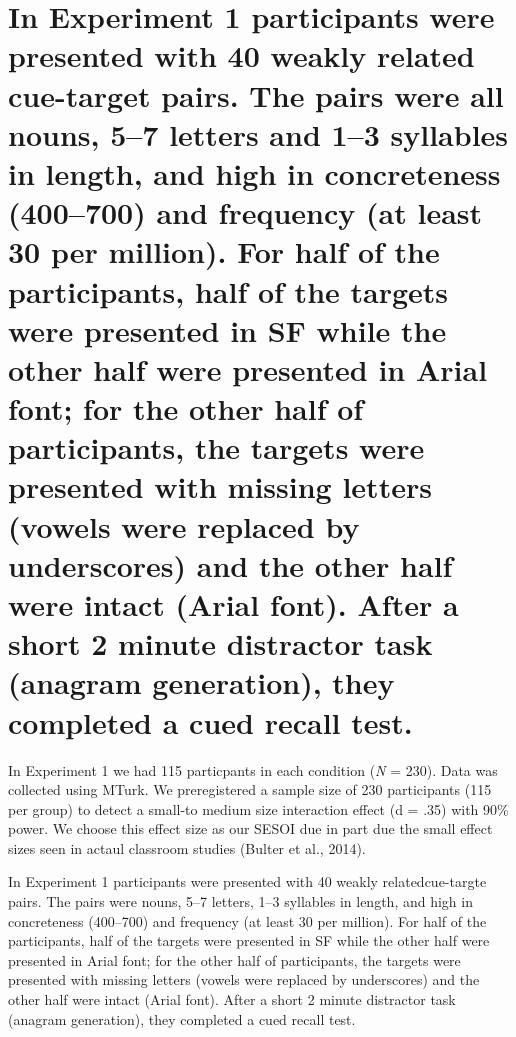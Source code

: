 \documentclass[]{article}
\begin{document}
\hypertarget{in-experiment-1-participants-were-presented-with-40-weakly-related-cue-target-pairs.-the-pairs-were-all-nouns-57-letters-and-13-syllables-in-length-and-high-in-concreteness-400700-and-frequency-at-least-30-per-million.-for-half-of-the-participants-half-of-the-targets-were-presented-in-sf-while-the-other-half-were-presented-in-arial-font-for-the-other-half-of-participants-the-targets-were-presented-with-missing-letters-vowels-were-replaced-by-underscores-and-the-other-half-were-intact-arial-font.-after-a-short-2-minute-distractor-task-anagram-generation-they-completed-a-cued-recall-test.}{%
\section{In Experiment 1 participants were presented with 40 weakly
related cue-target pairs. The pairs were all nouns, 5--7 letters and
1--3 syllables in length, and high in concreteness (400--700) and
frequency (at least 30 per million). For half of the participants, half
of the targets were presented in SF while the other half were presented
in Arial font; for the other half of participants, the targets were
presented with missing letters (vowels were replaced by underscores) and
the other half were intact (Arial font). After a short 2 minute
distractor task (anagram generation), they completed a cued recall
test.}\label{in-experiment-1-participants-were-presented-with-40-weakly-related-cue-target-pairs.-the-pairs-were-all-nouns-57-letters-and-13-syllables-in-length-and-high-in-concreteness-400700-and-frequency-at-least-30-per-million.-for-half-of-the-participants-half-of-the-targets-were-presented-in-sf-while-the-other-half-were-presented-in-arial-font-for-the-other-half-of-participants-the-targets-were-presented-with-missing-letters-vowels-were-replaced-by-underscores-and-the-other-half-were-intact-arial-font.-after-a-short-2-minute-distractor-task-anagram-generation-they-completed-a-cued-recall-test.}}

In Experiment 1 we had 115 particpants in each condition (\emph{N} =
230). Data was collected using MTurk. We preregistered a sample size of
230 participants (115 per group) to detect a small-to medium size
interaction effect (d = .35) with 90\% power. We choose this effect size
as our SESOI due in part due the small effect sizes seen in actaul
classroom studies (Bulter et al., 2014).

In Experiment 1 participants were presented with 40 weakly
relatedcue-targte pairs. The pairs were nouns, 5--7 letters, 1--3
syllables in length, and high in concreteness (400--700) and frequency
(at least 30 per million). For half of the participants, half of the
targets were presented in SF while the other half were presented in
Arial font; for the other half of participants, the targets were
presented with missing letters (vowels were replaced by underscores) and
the other half were intact (Arial font). After a short 2 minute
distractor task (anagram generation), they completed a cued recall test.
\end{document}
